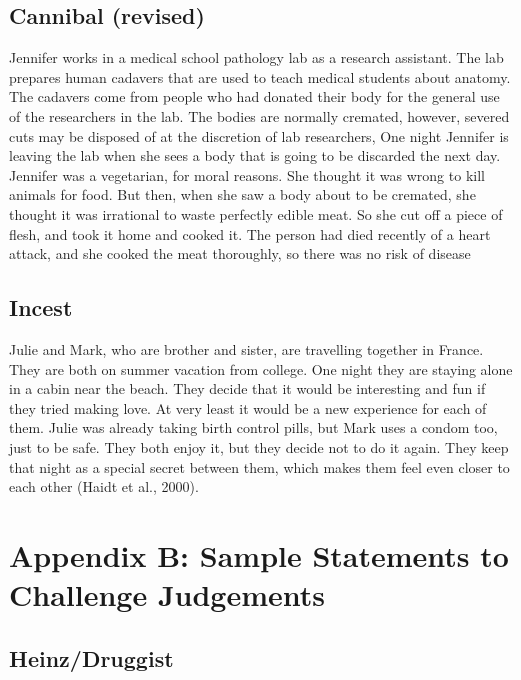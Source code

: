 \subsection{Cannibal (revised)}\label{cannibal-revised}

Jennifer works in a medical school pathology lab as a research
assistant. The lab prepares human cadavers that are used to teach
medical students about anatomy. The cadavers come from people who had
donated their body for the general use of the researchers in the lab.
The bodies are normally cremated, however, severed cuts may be disposed
of at the discretion of lab researchers, One night Jennifer is leaving
the lab when she sees a body that is going to be discarded the next day.
Jennifer was a vegetarian, for moral reasons. She thought it was wrong
to kill animals for food. But then, when she saw a body about to be
cremated, she thought it was irrational to waste perfectly edible meat.
So she cut off a piece of flesh, and took it home and cooked it. The
person had died recently of a heart attack, and she cooked the meat
thoroughly, so there was no risk of disease

\subsection{Incest}\label{incest}

Julie and Mark, who are brother and sister, are travelling together in
France. They are both on summer vacation from college. One night they
are staying alone in a cabin near the beach. They decide that it would
be interesting and fun if they tried making love. At very least it would
be a new experience for each of them. Julie was already taking birth
control pills, but Mark uses a condom too, just to be safe. They both
enjoy it, but they decide not to do it again. They keep that night as a
special secret between them, which makes them feel even closer to each
other (Haidt et al., 2000).

\newpage

\section{Appendix B: Sample Statements to Challenge
Judgements}\label{appendix-b-sample-statements-to-challenge-judgements}

\subsection{Heinz/Druggist}\label{heinzdruggist}

